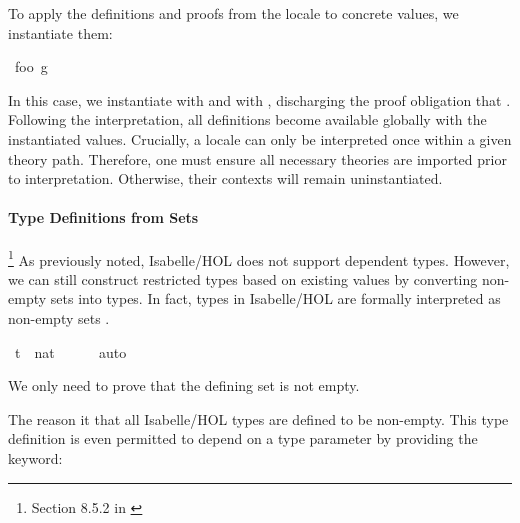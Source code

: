 To apply the definitions and proofs from the locale to concrete values, we instantiate them:

\begin{isabellebody}\isanewline
{}\isamarkupfalse%
\ foo\ g\ {}\isanewline
\ \ %
\isanewline
\end{isabellebody}

In this case, we instantiate  with  and  with , discharging the proof obligation that .
Following the interpretation, all definitions become available globally with the instantiated values.
Crucially, a locale can only be interpreted once within a given theory path.
Therefore, one must ensure all necessary theories are imported prior to interpretation.
Otherwise, their contexts will remain uninstantiated.

\paragraph{Type Definitions from Sets}\footnote{Section 8.5.2 in \cite{nipkow2002isabelle}}
As previously noted, Isabelle/HOL does not support dependent types.
However, we can still construct restricted types based on existing values by converting non-empty sets into types.
In fact, types in Isabelle/HOL are formally interpreted as non-empty sets \cite{kunvcar2016types}.

\begin{isabellebody}\isanewline
{}\isamarkupfalse%
\ t\ {\isacharequal}{\kern0pt}\ {\isachardoublequoteopen}{\isacharbraceleft}{\kern0pt}{}{\isacharcolon}{\kern0pt}{\isacharcolon}{\kern0pt}nat{\isacharcomma}{\kern0pt}\ {}{\isacharcomma}{\kern0pt}\ {}{}{\isacharcomma}{\kern0pt}\ {}{}{\isacharbraceright}{\kern0pt}{\isachardoublequoteclose}%
\ \isamarkupfalse%
\ auto%
\end{isabellebody}

We only need to prove that the defining set is not empty.

The reason it that all Isabelle/HOL types are defined to be non-empty.
This type definition is even permitted to depend on a type parameter by providing the  keyword:

